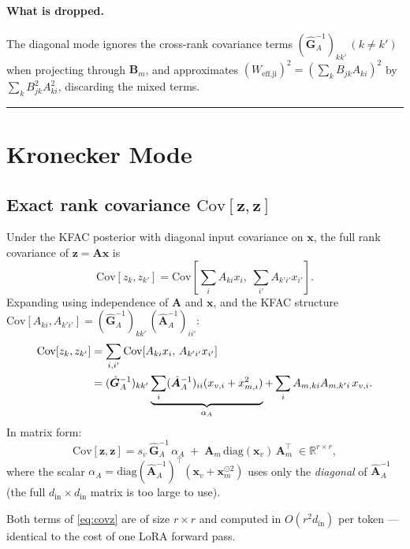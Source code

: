 \documentclass[11pt]{article}
\newcommand{\R}{\mathbb{R}}
\newcommand{\Cov}{\mathrm{Cov}}
\newcommand{\diag}{\mathrm{diag}}
\begin{document}
\paragraph{What is dropped.}
The diagonal mode ignores the cross-rank covariance terms
$(\hat{\bm G}_A^{-1})_{kk'}\,(k\neq k')$ when projecting through $\bm B_m$,
and approximates $(W_\text{eff,ji})^2 = (\sum_k B_{jk} A_{ki})^2$ by
$\sum_k B_{jk}^2 A_{ki}^2$, discarding the mixed terms.

\bigskip\hrule\bigskip

\section{Kronecker Mode}

\subsection{Exact rank covariance $\Cov[\bm z, \bm z]$}

Under the KFAC posterior with diagonal input covariance on $\bm x$, the full
rank covariance of $\bm z = \bm A \bm x$ is
\begin{equation}
  \Cov[z_k, z_{k'}] =
    \Cov[\textstyle\sum_i A_{ki} x_i,\; \sum_{i'} A_{k'i'} x_{i'}].
\end{equation}
Expanding using independence of $\bm A$ and $\bm x$, and the
KFAC structure $\Cov[A_{ki}, A_{k'i'}] = (\hat{\bm G}_A^{-1})_{kk'}\,(\hat{\bm A}_A^{-1})_{ii'}$:
\begin{align}
  \Cov[z_k, z_{k'}]
  &= \sum_{i,i'} \Cov[A_{ki} x_i,\, A_{k'i'} x_{i'}] \notag\\
  &= (\hat{\bm G}_A^{-1})_{kk'}\underbrace{\sum_i (\hat{\bm A}_A^{-1})_{ii}(x_{v,i} + x_{m,i}^2)}_{\alpha_A}
    + \sum_i A_{m,ki} A_{m,k'i}\, x_{v,i}.
\end{align}
In matrix form:
\begin{equation}
  \boxed{
  \Cov[\bm z, \bm z] = s_v\,\hat{\bm G}_A^{-1}\,\alpha_A
  \;+\; \bm A_m\,\diag(\bm x_v)\,\bm A_m^\top
  }
  \;\in \R^{r \times r},
  \label{eq:covz}
\end{equation}
where the scalar $\alpha_A = \diag(\hat{\bm A}_A^{-1})^\top (\bm x_v + \bm x_m^{\odot 2})$
uses only the \emph{diagonal} of $\hat{\bm A}_A^{-1}$
(the full $d_\text{in} \times d_\text{in}$ matrix is too large to use).

Both terms of \eqref{eq:covz} are of size $r \times r$ and computed in
$O(r^2 d_\text{in})$ per token — identical to the cost of one LoRA forward pass.
\end{document}
